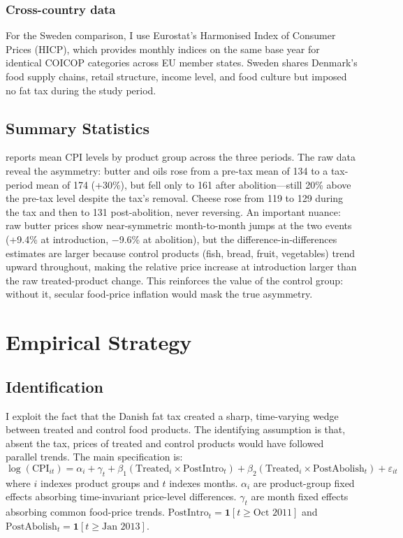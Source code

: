 \documentclass[12pt]{article}
\begin{document}
\subsubsection*{Cross-country data} For the Sweden comparison, I use Eurostat's Harmonised Index of Consumer Prices (HICP), which provides monthly indices on the same base year for identical COICOP categories across EU member states. Sweden shares Denmark's food supply chains, retail structure, income level, and food culture but imposed no fat tax during the study period.

\subsection{Summary Statistics}



 reports mean CPI levels by product group across the three periods. The raw data reveal the asymmetry: butter and oils rose from a pre-tax mean of 134 to a tax-period mean of 174 (+30\%), but fell only to 161 after abolition---still 20\% above the pre-tax level despite the tax's removal. Cheese rose from 119 to 129 during the tax and then to 131 post-abolition, never reversing. An important nuance: raw butter prices show near-symmetric month-to-month jumps at the two events (+9.4\% at introduction, $-$9.6\% at abolition), but the difference-in-differences estimates are larger because control products (fish, bread, fruit, vegetables) trend upward throughout, making the relative price increase at introduction larger than the raw treated-product change. This reinforces the value of the control group: without it, secular food-price inflation would mask the true asymmetry.

\section{Empirical Strategy}

\subsection{Identification}

I exploit the fact that the Danish fat tax created a sharp, time-varying wedge between treated and control food products. The identifying assumption is that, absent the tax, prices of treated and control products would have followed parallel trends. The main specification is:
\begin{equation}\label{eq:main}
  \log(\text{CPI}_{it}) = \alpha_i + \gamma_t + \beta_1 (\text{Treated}_i \times \text{PostIntro}_t) + \beta_2 (\text{Treated}_i \times \text{PostAbolish}_t) + \varepsilon_{it}
\end{equation}
where $i$ indexes product groups and $t$ indexes months. $\alpha_i$ are product-group fixed effects absorbing time-invariant price-level differences. $\gamma_t$ are month fixed effects absorbing common food-price trends. $\text{PostIntro}_t = \mathbf{1}[t \geq \text{Oct 2011}]$ and $\text{PostAbolish}_t = \mathbf{1}[t \geq \text{Jan 2013}]$.
\end{document}
